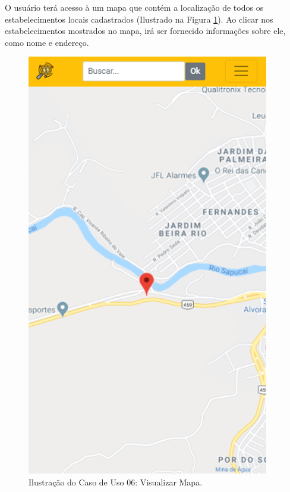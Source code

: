 O usuário terá acesso à um mapa que contém a localização de todos os estabelecimentos locais cadastrados (Ilustrado na Figura \ref{fig:mapa}). Ao clicar nos estabelecimentos mostrados no mapa, irá ser fornecido informações sobre ele, como nome e endereço.

\begin{figure}[H]
\centering
\includegraphics[width=\linewidth]{figuras/tela_mapa.png}
\caption{Ilustração do Caso de Uso 06: Visualizar Mapa.}
\label{fig:mapa}
\end{figure}
